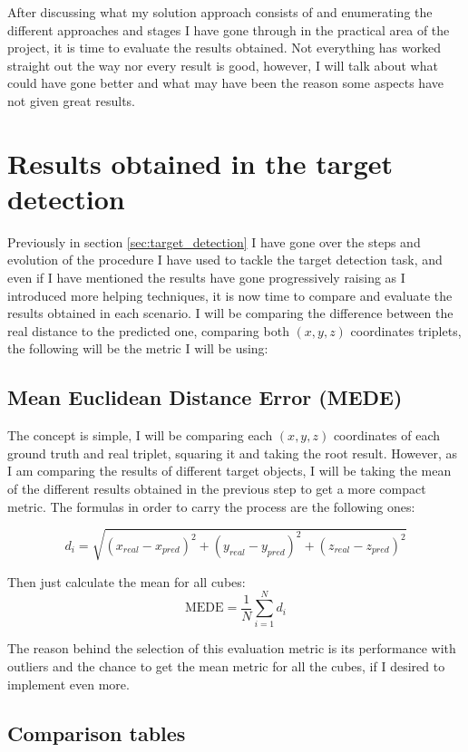 After discussing what my solution approach consists of and enumerating the different approaches and stages I have gone through in the practical area of the project, it is time to evaluate the results obtained. Not everything has worked straight out the way nor every result is good, however, I will talk about what could have gone better and what may have been the reason some aspects have not given great results. 


\section{Results obtained in the target detection}
Previously in section \ref{sec:target_detection} I have gone over the steps and evolution of the procedure I have used to tackle the target detection task, and even if I have mentioned the results have gone progressively raising as I introduced more helping techniques, it is now time to compare and evaluate the results obtained in each scenario. I will be comparing the difference between the real distance to the predicted one, comparing both $(x,y,z)$ coordinates triplets, the following will be the metric I will be using: 

\subsection{Mean Euclidean Distance Error (MEDE)}
The concept is simple, I will be comparing each $(x,y,z)$ coordinates of each ground truth and real triplet, squaring it and taking the root result. However, as I am comparing the results of different target objects, I will be taking the mean of the different results obtained in the previous step to get a more compact metric. The formulas in order to carry the process are the following ones:

$$d_i = \sqrt{(x_{real} - x_{pred})^2 + (y_{real} - y_{pred})^2 + (z_{real} - z_{pred})^2}$$

Then just calculate the mean for all cubes:$$\text{MEDE} = \frac{1}{N} \sum_{i=1}^{N} d_i$$

The reason behind the selection of this evaluation metric is its performance with outliers and the chance to get the mean metric for all the cubes, if I desired to implement even more. 

\subsection{Comparison tables}

